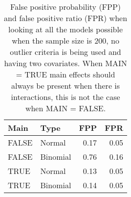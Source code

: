 \begin{longtable}{llrr}
\caption{False positive probability (FPP) and false positive ratio (FPR) when looking at all the models possible when the sample size is 200, no outlier criteria is being used and having two covariates. When MAIN = TRUE main effects should always be present when there is interactions, this is not the case when MAIN = FALSE. } \\ 
  \hline
Main & Type & FPP & FPR \\ 
  \hline
FALSE & Normal & 0.17 & 0.05 \\ 
  FALSE & Binomial & 0.76 & 0.16 \\ 
  TRUE & Normal & 0.13 & 0.05 \\ 
  TRUE & Binomial & 0.14 & 0.05 \\ 
   \hline
\hline
\end{longtable}
